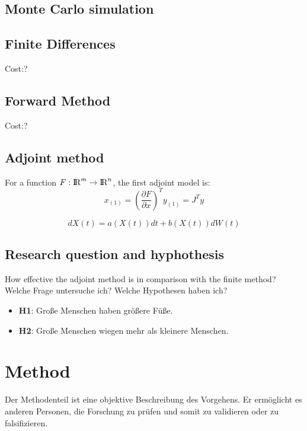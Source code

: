 \subsection{Monte Carlo simulation}

\subsection{Finite Differences}
Cost:?
\subsection{Forward Method}
Cost:?
\subsection{Adjoint method}
For a function $F:{\rm I\!R}^m \rightarrow {\rm I\!R}^n$, the first adjoint model is:
\begin{equation}
	x_{(1)}={\left(\frac{\partial F}{\partial x}{}\right)}^T y_{(1)} = J^T y
\end{equation}


\begin{equation}
  dX(t) = a(X(t))dt + b(X(t))dW(t)
\end{equation}






\subsection{Research question and hyphothesis}
How effective the adjoint method is in comparison with the finite method?
Welche Frage untersuche ich? Welche Hypothesen haben ich?
\begin{itemize}
\item \textbf{H1}: Große Menschen haben größere Füße.
\item \textbf{H2}: Große Menschen wiegen mehr als kleinere Menschen.
\end{itemize}



\section{Method}


Der Methodenteil ist eine objektive Beschreibung des Vorgehens. Er ermöglicht es anderen Personen, die Forschung zu prüfen und somit zu validieren oder zu falsifizieren.

